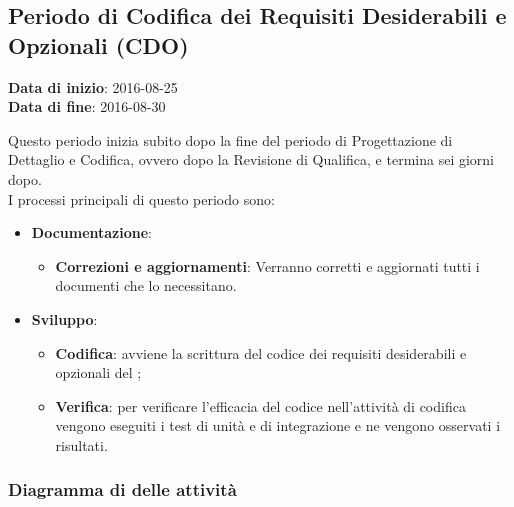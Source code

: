 	\subsection{Periodo di Codifica dei Requisiti Desiderabili e Opzionali (CDO)}
	\begin{center}
		\textbf{Data di inizio}: 2016-08-25 \\
		\textbf{Data di fine}: 2016-08-30 \\
	\end{center}
	Questo periodo inizia subito dopo la fine del periodo di Progettazione di Dettaglio e Codifica, ovvero dopo la Revisione di Qualifica, e termina sei giorni dopo. \\
	I processi principali di questo periodo sono: 
		\begin{itemize}
			\item \textbf{Documentazione}:
			\att
			\begin{itemize}
				\item \textbf{Correzioni e aggiornamenti}: Verranno corretti e aggiornati tutti i documenti che lo necessitano. 
			\end{itemize}
			\item \textbf{Sviluppo}:
			\att
			\begin{itemize}
				\item \textbf{Codifica}: avviene la scrittura del codice dei requisiti desiderabili e opzionali del ;
				\item \textbf{Verifica}: per verificare l'efficacia del codice  nell'attività di codifica vengono eseguiti i test di unità e di integrazione e ne vengono osservati i risultati. 
			\end{itemize}
		\end{itemize}
		\subsubsection{Diagramma di  delle attività}
		
